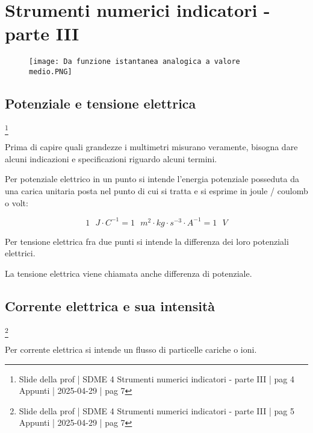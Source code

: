 \chapter{Strumenti numerici indicatori - parte III}

\begin{figure}[h]
    \centering
    \texttt{[image: Da funzione istantanea analogica a valore medio.PNG]}
\end{figure}

\newpage    

\section{Potenziale e tensione elettrica}
\footnote{Slide della prof | SDME 4 Strumenti numerici indicatori - parte III | pag 4 \\  
Appunti | 2025-04-29 | pag 7}

Prima di capire quali grandezze i multimetri misurano veramente, 
bisogna dare alcuni indicazioni e specificazioni riguardo alcuni termini. \newline 

Per potenziale elettrico in un punto si intende l'energia potenziale posseduta 
da una carica unitaria posta nel punto di cui si tratta e si esprime in joule / coulomb o volt: 

{
    \Large 
    \begin{equation}
        1 \text{ } J \cdot C^{-1} 
        = 
        1 \text{ } m^{2} \cdot kg \cdot s^{-3} \cdot A ^{-1} 
        = 
        1 \text{ } V
    \end{equation}
}

Per tensione elettrica fra due punti si intende la differenza dei loro potenziali elettrici. \newline 

La tensione elettrica viene chiamata anche differenza di potenziale. \newline 

\newpage 

\section{Corrente elettrica e sua intensità}
\footnote{Slide della prof | SDME 4 Strumenti numerici indicatori - parte III | pag 5 \\  
Appunti | 2025-04-29 | pag 7}

Per corrente elettrica si intende un flusso di particelle cariche o ioni. \newline 

